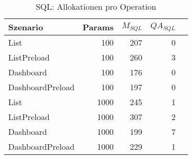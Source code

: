 
\begin{table}[ht]
\centering
\caption{SQL: Allokationen pro Operation}
\begin{tabular}{lrrrr}
\toprule
Szenario & Params & ${M_{SQL}}$ & ${QA_{SQL}}$  \\
\midrule

	List & 100 & 207 & 0 \\
	ListPreload & 100 & 260 & 3 \\
	Dashboard & 100 & 176 & 0 \\
	DashboardPreload & 100 & 197 & 0 \\
	List & 1000 & 245 & 1 \\
	ListPreload & 1000 & 307 & 2 \\
	Dashboard & 1000 & 199 & 7 \\
	DashboardPreload & 1000 & 229 & 1 \\
\bottomrule
\end{tabular}
\label{tab:benchmark_sql_allocsperop}
\end{table}
	